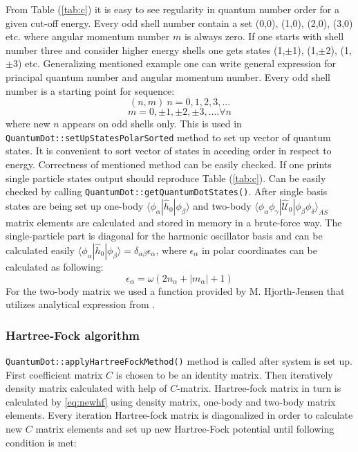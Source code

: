 \documentclass[10pt]{article}
\newcommand*{\hatU}{\hat{\mathcal{U}}}
\newcommand{\code}[1]{\colorbox{coding}{\texttt{#1}}}
\begin{document}
From Table (\ref{tab:c}) it is easy to see regularity in quantum number order for a given cut-off energy. Every odd shell number contain a set (0,0), (1,0), (2,0), (3,0) etc. where angular momentum number $m$ is always zero.
If one starts with shell number three and consider higher energy shells one gets states (1,$\pm$1), (1,$\pm$2), (1,$\pm$3) etc.
Generalizing mentioned example one can write general expression for principal quantum number and angular momentum number.
Every odd shell number is a starting point for sequence:
\[
(n, m)\ 
n = 0, 1, 2, 3, ... 
\]
\[
m = 0, \pm 1, \pm 2, \pm 3, .... \forall  n
\]
where new $n$ appears on odd shells only.
This is used in \code{QuantumDot::setUpStatesPolarSorted} method to set up vector of quantum states. It is convenient to sort vector of states in acceding order in respect to energy.
Correctness of mentioned method can be easily checked. If one prints single particle states output should reproduce Table (\ref{tab:c}). Can be easily checked by calling \code{QuantumDot::getQuantumDotStates()}.
After single basis states are being set up one-body $\langle \phi_{\alpha} | \hat{h}_0 | \phi_{\beta} \rangle$ and two-body $\langle \phi_{\alpha}\phi_{\gamma}|\hatU_{0}|\phi_{\beta}\phi_{\delta}\rangle_{AS}$ matrix elements are calculated and stored in memory in a brute-force way. The single-particle part is diagonal for the harmonic oscillator basis and can be calculated easily $\langle \phi_{\alpha} | \hat{h}_0 | \phi_{\beta} \rangle = \delta_{\alpha\beta}\epsilon_{\alpha}$, where $\epsilon_{\alpha}$ in polar coordinates can be calculated as following:
\[
\epsilon_{\alpha} = \omega(2n_{\alpha} + |m_{\alpha}| + 1)
\]
For the two-body matrix we used a function provided by M. Hjorth-Jensen that utilizes analytical expression from \cite{Anisimovas}.  

\subsubsection{Hartree-Fock algorithm}

\code{QuantumDot::applyHartreeFockMethod()} method is called after system is set up. First coefficient matrix $C$ is chosen to be an identity matrix.
Then iteratively density matrix calculated with help of $C$-matrix. Hartree-fock matrix in turn is calculated by \ref{eq:newhf} using density matrix, one-body and two-body matrix elements.
Every iteration Hartree-fock matrix is diagonalized in order to calculate new $C$ matrix elements and set up new Hartree-Fock potential until following condition is met:
\end{document}
